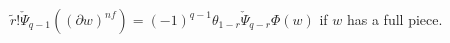 %

\begin{lemma}
	$\tilde{r}!\check{\Psi}_{q-1}((\partial w)^{nf}) = (-1)^{q-1}\theta_{1-r} \check{\Psi}_{q-r}\Phi(w)$ if $w$ has a full piece.
\end{lemma}


